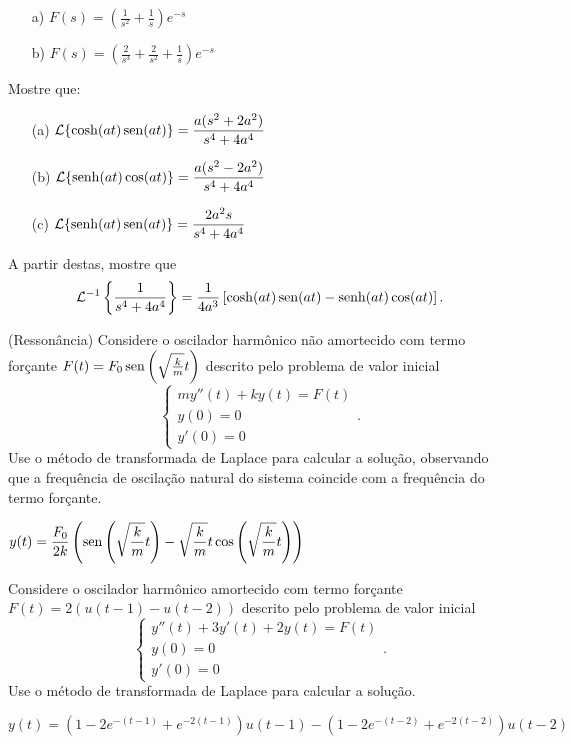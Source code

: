 \documentclass[Main.tex]{subfiles}
\begin{document}
\begin{Answer}
 \begin{itemize}
  \item[a)] $F(s)=\left(\frac{1}{s^2}+\frac{1}{s}\right)e^{-s}$
      \item[b)] $F(s)=\left(\frac{2}{s^3}+\frac{2}{s^2}+\frac{1}{s}\right)e^{-s}$
 \end{itemize}
\end{Answer}

\begin{Exercise}
Mostre que:
\begin{itemize}
  \item[(a)] $\displaystyle \mathcal{L}\{ \cosh (at) \operatorname{sen} (at) \} = \frac{a (s^2 + 2 a^2)}{s^4 + 4a^4}$
  \item[(b)] $\displaystyle \mathcal{L} \{ \operatorname{senh} (at) \cos (at) \} = \frac{a (s^2 - 2 a^2)}{s^4 + 4a^4}$
  \item[(c)] $\displaystyle \mathcal{L} \{ \operatorname{senh} (at) \operatorname{sen} (at) \} = \frac{2 a^2 s}{s^4 + 4a^4}$
\end{itemize}
 \noindent A partir destas, mostre que $$\mathcal{L}^{-1}\left\{ \frac{1}{s^4 + 4a^4}\right\} = \frac{1}{4a^3} \left[\cosh (at) \operatorname{sen} (at) - \operatorname{senh} (at) \cos(at)\right]. $$
\end{Exercise}


\begin{Exercise}(Ressonância) Considere o oscilador harmônico não amortecido com termo forçante $F(t)=F_0\operatorname{sen}\left(\sqrt{\frac{k}{m}}t\right)$ descrito pelo problema de valor inicial
$$\left\{
\begin{array}{l}
 my''(t)+ky(t)=F(t)\\
 y(0)=0\\
 y'(0)=0
\end{array}
\right..
$$
Use o método de transformada de Laplace para calcular a solução, observando que a frequência de oscilação natural do sistema coincide com a frequência do termo forçante.
\end{Exercise}
\begin{Answer}
$\displaystyle y(t)=\frac{F_0}{2k}\left(\operatorname{sen}\left(\sqrt{\frac{k}{m}}t\right)-\sqrt{\frac{k}{m}}t\cos\left(\sqrt{\frac{k}{m}}t\right)\right)$
\end{Answer}
\begin{Exercise}Considere o oscilador harmônico amortecido com termo forçante $F(t)=2(u(t-1)-u(t-2))$ descrito pelo problema de valor inicial
$$\left\{
\begin{array}{l}
 y''(t)+3y'(t)+2y(t)=F(t)\\
 y(0)=0\\
 y'(0)=0
\end{array}
\right..
$$
Use o método de transformada de Laplace para calcular a solução.
\end{Exercise}
\begin{Answer}
$\displaystyle y(t)=(1-2e^{-(t-1)}+e^{-2(t-1)})u(t-1)-(1-2e^{-(t-2)}+e^{-2(t-2)})u(t-2)$
\end{Answer}
\end{document}
